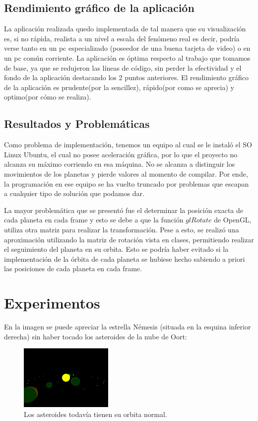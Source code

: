 \documentclass[journal]{IEEEtran}
\begin{document}
\subsection{Rendimiento gráfico de la aplicación}

La aplicación realizada quedo implementada de tal manera que su visualización es, si no rápida, realista a un nivel a escala del fenómeno real es decir, podría verse tanto en un pc especializado (poseedor de una buena tarjeta de video) o en un pc común  corriente. La aplicación es óptima respecto al trabajo que tomamos de base, ya que se redujeron las líneas de código, sin perder la efectividad y el fondo de la aplicación destacando los 2 puntos anteriores. El rendimiento gráfico de la aplicación es prudente(por la sencillez), rápido(por como se aprecia) y optimo(por cómo se realiza).

\subsection{Resultados y Problemáticas}

Como problema de implementación, tenemos un equipo al cual se le instaló el SO Linux Ubuntu, el cual no posee aceleración gráfica, por lo que el proyecto no alcanza su máximo corriendo en esa máquina. No se alcanza a distinguir los movimientos de los planetas y pierde valores al momento de compilar. Por ende, la programación en ese equipo se ha vuelto truncado por problemas que escapan a cualquier tipo de solución que podamos dar. 

La mayor problemática que se presentó fue el determinar la posición exacta de cada planeta en cada frame y esto se debe a que la función $glRotate$ de OpenGL, utiliza otra matriz para realizar la transformación. Pese a esto, se realizó una aproximación utilizando la matriz de rotación vista en clases, permitiendo realizar el seguimiento del planeta en su orbita. Esto se podría haber evitado si la implementación de la órbita de cada planeta se hubiese hecho sabiendo a priori las posiciones de cada planeta en cada frame.

\section{Experimentos}

En la imagen se puede apreciar la estrella Némesis (situada en la esquina inferior derecha) sin haber tocado los asteroides de la nube de Oort:

\begin{figure}[h!]
	\includegraphics[width=0.4\textwidth, height=0.25\textwidth]{imagen_fea.png}
	\centering
	\caption{Los asteroides todavía tienen su orbita normal.}
\end{figure}
\end{document}
